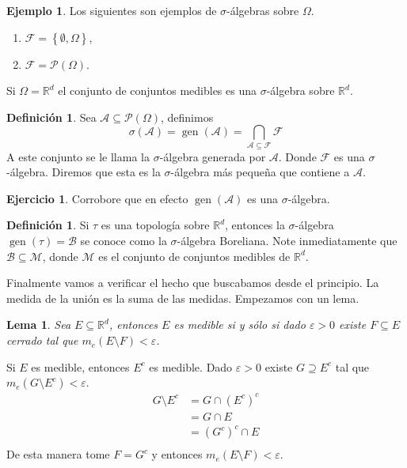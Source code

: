 \documentclass[12pt]{article}
\theoremstyle{plain}
\newtheorem{Lem}[Th]{Lema}             %
\theoremstyle{definition}
\newtheorem{Def}[Th]{Definición}       %
\newtheorem{Ex}[Th]{Ejemplo}               %
\newtheorem{Ej}[Th]{Ejercicio}
\theoremstyle{remark}
\numberwithin{equation}{section}
\DeclareMathOperator{\gen}{gen}     %
\newcommand{\Om}{\varOmega}         %
\newcommand{\sg}{\sigma}            %
\newcommand{\bR}{\mathbb{R}}        %
\newcommand{\cF}{\mathcal{F}}       %
\newcommand{\cA}{\mathcal{A}}       %
\newcommand{\cB}{\mathcal{B}}       %
\newcommand{\cP}{\mathcal{P}}       %
\newcommand{\cM}{\mathcal{M}}       %
\renewcommand{\:}{\colon}           %
\newcommand{\conj}[1]{\left\lbrace#1\right\rbrace}
\begin{document}
\begin{multicols}{2}
\begin{Ex}
  Los siguientes son ejemplos de $\sigma$-álgebras sobre $\Om$.
  \begin{enumerate}
    \item $\cF=\conj{\emptyset,\Om}$,
    \item $\cF=\cP(\Om)$.
  \end{enumerate}
  Si $\Om=\bR^d$ el conjunto de conjuntos medibles es una $\sigma$-álgebra sobre $\bR^d$.
\end{Ex}

\begin{Def}
  Sea $\cA\subseteq\cP(\Om)$, definimos
  $$\sg(\cA)=\gen(\cA)=\bigcap_{\cA\subseteq\cF}\cF$$
  A este conjunto se le llama la $\sg$-álgebra generada por $\cA$. Donde $\cF$ es una $\sg$-álgebra. Diremos que esta es la $\sg$-álgebra más pequeña que contiene a $\cA$.
\end{Def}

\begin{Ej}
    Corrobore que en efecto $\gen(\cA)$ es una $\sg$-álgebra.
\end{Ej}

\begin{Def}
  Si $\tau$ es una topología sobre $\bR^d$, entonces la $\sg$-álgebra $\gen(\tau)=\cB$ se conoce como la $\sg$-álgebra Boreliana. Note inmediatamente que $\cB\subseteq\cM$, donde $\cM$ es el conjunto de conjuntos medibles de $\bR^d$.
\end{Def}

Finalmente vamos a verificar el hecho que buscabamos desde el principio. La medida de la unión es la suma de las medidas. Empezamos con un lema.

\begin{Lem}
  Sea $E\subseteq\bR^d$, entonces $E$ es medible si y sólo si dado $\varepsilon>0$ existe $F\subseteq E$ cerrado tal que $m_e(E\setminus F)<\varepsilon$.
\end{Lem}

\begin{ptcbp}
Si $E$ es medible, entonces $E^c$ es medible. Dado $\varepsilon>0$ existe $G\supseteq E^c$ tal que $m_e(G\setminus E^c)<\varepsilon$.
\begin{align*}
  G\setminus E^c &=G\cap(E^c)^c\\
   &=G\cap E\\
    &=(G^c)^c\cap E\\
\end{align*}
De esta manera tome $F=G^c$ y entonces $m_e(E\setminus F)<\varepsilon$.
\end{ptcbp}


\end{multicols}
\end{document}
